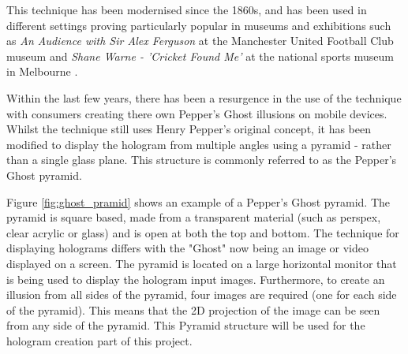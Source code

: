 This technique has been modernised since the 1860s, and has been used in different settings proving particularly popular in museums and exhibitions such as \textit{An Audience with Sir Alex Ferguson} at the Manchester United Football Club museum \cite{alex_ferguson} and \textit{Shane Warne - 'Cricket Found Me'} at the national sports museum in Melbourne \cite{shane_warne}.

Within the last few years, there has been a resurgence in the use of the technique with consumers creating there own Pepper's Ghost illusions on mobile devices. Whilst the technique still uses Henry Pepper's original concept, it has been modified to display the hologram from multiple angles using a pyramid - rather than a single glass plane. This structure is commonly referred to as the Pepper's Ghost pyramid.
\begin{figure}[h!]
\end{figure}

Figure \ref{fig:ghost_pramid} shows an example of a Pepper's Ghost pyramid. The pyramid is square based, made from a transparent material (such as perspex, clear acrylic or glass) and is open at both the top and bottom. The technique for displaying holograms differs with the "Ghost" now being an image or video displayed on a screen. The pyramid is located on a large horizontal monitor that is being used to display the hologram input images. Furthermore, to create an illusion from all sides of the pyramid, four images are required (one for each side of the pyramid). This  means that the 2D projection of the image can be seen from any side of the pyramid. This Pyramid structure will be used for the hologram creation part of this project.

